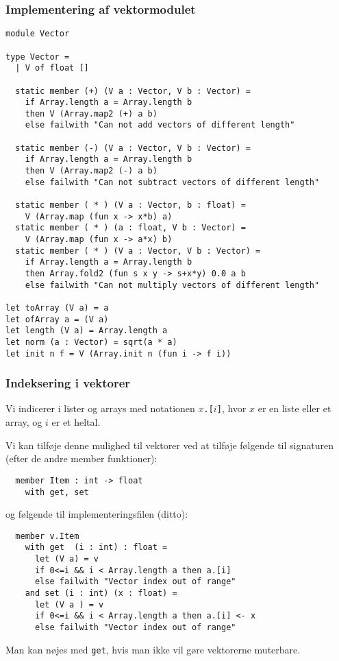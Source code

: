 \documentclass{beamer}
\begin{document}
\begin{frame}[fragile=singleslide]
\frametitle{Implementering af vektormodulet}

\renewcommand{\baselinestretch}{0.77}
{\scriptsize
\begin{verbatim}
module Vector

type Vector =
  | V of float []

  static member (+) (V a : Vector, V b : Vector) =
    if Array.length a = Array.length b
    then V (Array.map2 (+) a b)
    else failwith "Can not add vectors of different length"

  static member (-) (V a : Vector, V b : Vector) =
    if Array.length a = Array.length b
    then V (Array.map2 (-) a b)
    else failwith "Can not subtract vectors of different length"

  static member ( * ) (V a : Vector, b : float) =
    V (Array.map (fun x -> x*b) a)
  static member ( * ) (a : float, V b : Vector) =
    V (Array.map (fun x -> a*x) b)
  static member ( * ) (V a : Vector, V b : Vector) =
    if Array.length a = Array.length b
    then Array.fold2 (fun s x y -> s+x*y) 0.0 a b
    else failwith "Can not multiply vectors of different length"

let toArray (V a) = a
let ofArray a = (V a)
let length (V a) = Array.length a
let norm (a : Vector) = sqrt(a * a)
let init n f = V (Array.init n (fun i -> f i))
\end{verbatim}
}
\renewcommand{\baselinestretch}{1.0}

\end{frame}

\begin{frame}[fragile=singleslide]
\frametitle{Indeksering i vektorer}

Vi indicerer i lister og arrays med notationen
\texttt{$x$.[$i$]}, hvor $x$ er en liste eller et array, og $i$ er et
heltal.

Vi kan tilføje denne mulighed til vektorer ved at tilføje følgende til
signaturen (efter de andre member funktioner):

\renewcommand{\baselinestretch}{0.82}
{\small
\begin{verbatim}
  member Item : int -> float
    with get, set
\end{verbatim}
}
\renewcommand{\baselinestretch}{1.0}

og følgende til implementeringsfilen (ditto):

\renewcommand{\baselinestretch}{0.82}
{\small
\begin{verbatim}
  member v.Item
    with get  (i : int) : float =
      let (V a) = v
      if 0<=i && i < Array.length a then a.[i]
      else failwith "Vector index out of range"
    and set (i : int) (x : float) =
      let (V a ) = v
      if 0<=i && i < Array.length a then a.[i] <- x
      else failwith "Vector index out of range"
\end{verbatim}
}
\renewcommand{\baselinestretch}{1.0}

Man kan nøjes med \texttt{get}, hvis man ikke vil gøre vektorerne muterbare.

\end{frame}
\end{document}

